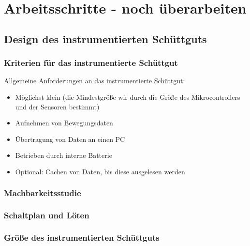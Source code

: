 \section{Arbeitsschritte - noch überarbeiten}


\subsection{Design des instrumentierten Schüttguts}


\subsubsection*{Kriterien für das instrumentierte Schüttgut}

Allgemeine Anforderungen an das instrumentierte Schüttgut:

\begin{itemize}
	\item Möglichst klein (die Mindestgröße wir durch die Größe des Mikrocontrollers und der Sensoren bestimmt)
	\item Aufnehmen von Bewegungsdaten
	\item Übertragung von Daten an einen PC
	\item Betrieben durch interne Batterie
	\item Optional: Cachen von Daten, bis diese ausgelesen werden 
\end{itemize}

\subsubsection*{Machbarkeitsstudie}

\subsubsection*{Schaltplan und Löten}



\subsubsection*{Größe des instrumentierten Schüttguts}

